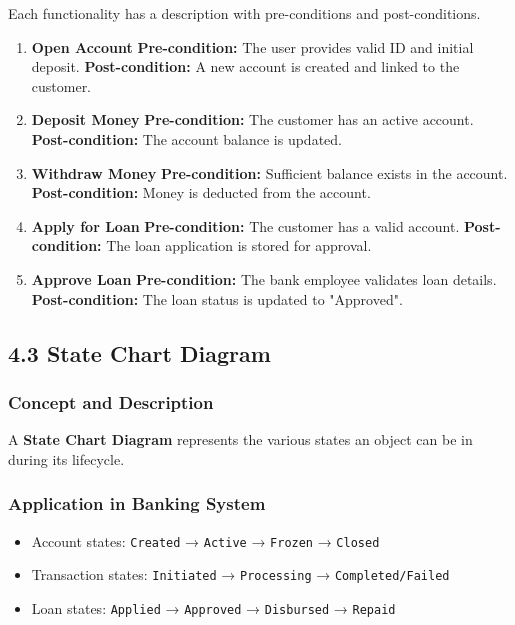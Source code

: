 Each functionality has a description with pre-conditions and
post-conditions.

\begin{enumerate}
\def\labelenumi{\arabic{enumi}.}
\item
  \textbf{Open Account} \textbf{Pre-condition:} The user provides valid
  ID and initial deposit. \textbf{Post-condition:} A new account is
  created and linked to the customer.
\item
  \textbf{Deposit Money} \textbf{Pre-condition:} The customer has an
  active account. \textbf{Post-condition:} The account balance is
  updated.
\item
  \textbf{Withdraw Money} \textbf{Pre-condition:} Sufficient balance
  exists in the account. \textbf{Post-condition:} Money is deducted from
  the account.
\item
  \textbf{Apply for Loan} \textbf{Pre-condition:} The customer has a
  valid account. \textbf{Post-condition:} The loan application is stored
  for approval.
\item
  \textbf{Approve Loan} \textbf{Pre-condition:} The bank employee
  validates loan details. \textbf{Post-condition:} The loan status is
  updated to "Approved".
\end{enumerate}

\subsection{4.3 State Chart Diagram}\label{state-chart-diagram}

\subsubsection{Concept and Description}\label{concept-and-description-3}

A \textbf{State Chart Diagram} represents the various states an object
can be in during its lifecycle.

\subsubsection{Application in Banking
System}\label{application-in-banking-system-3}

\begin{itemize}
\item
  Account states: \texttt{Created} → \texttt{Active} → \texttt{Frozen} →
  \texttt{Closed}
\item
  Transaction states: \texttt{Initiated} → \texttt{Processing} →
  \texttt{Completed/Failed}
\item
  Loan states: \texttt{Applied} → \texttt{Approved} → \texttt{Disbursed}
  → \texttt{Repaid}
\end{itemize}

